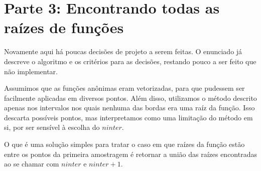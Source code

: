 \documentclass{article}
\begin{document}
\section{Parte 3: Encontrando todas as raízes de funções}
Novamente aqui há poucas decisões de projeto a serem feitas. O enunciado já descreve o algoritmo e os critérios para as decisões, restando pouco a ser feito que não implementar.  

Assumimos que as funções anônimas eram vetorizadas, para que pudessem ser facilmente aplicadas em diversos pontos. Além disso, utilizamos o método descrito apenas nos intervalos nos quais nenhuma das bordas era uma raíz da função. Isso descarta possíveis pontos, mas interpretamos como uma limitação do método em si, por ser sensível à escolha do $\textit{ninter}$.  

O que é uma solução simples para tratar o caso em que raízes da função estão entre os pontos da primeira amostragem é retornar a união das raízes encontradas ao se chamar com $\textit{ninter}$ e $\textit{ninter} + 1$.
\end{document}
